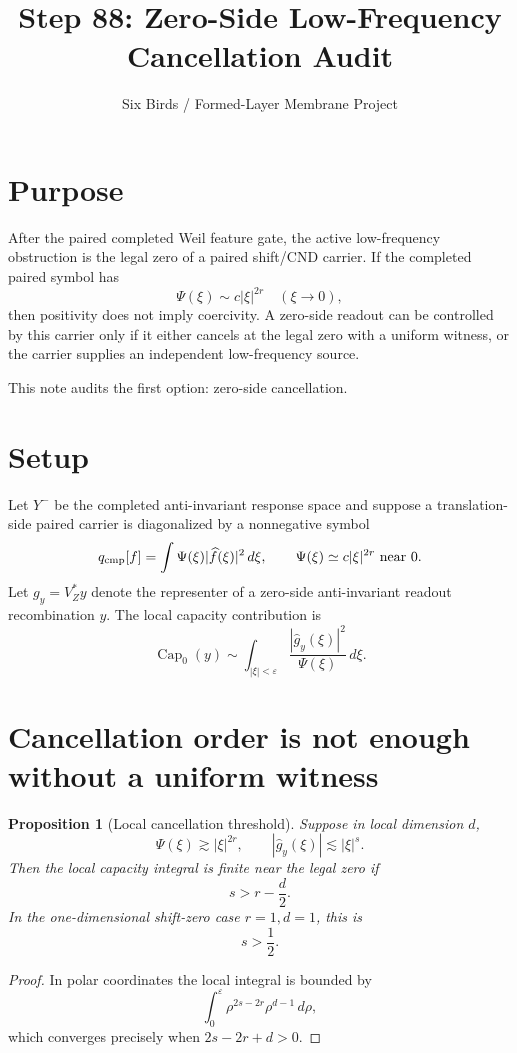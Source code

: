 \documentclass[11pt]{article}
\title{Step 88: Zero-Side Low-Frequency Cancellation Audit}
\author{Six Birds / Formed-Layer Membrane Project}
\date{}
\newtheorem{proposition}{Proposition}
\begin{document}
\maketitle

\section{Purpose}

After the paired completed Weil feature gate, the active low-frequency obstruction is the legal zero of a paired shift/CND carrier.  If the completed paired symbol has
\[
\Psi(\xi)\sim c|\xi|^{2r}
\quad (\xi\to 0),
\]
then positivity does not imply coercivity.  A zero-side readout can be controlled by this carrier only if it either cancels at the legal zero with a uniform witness, or the carrier supplies an independent low-frequency source.

This note audits the first option: zero-side cancellation.

\section{Setup}

Let \(Y^{-}\) be the completed anti-invariant response space and suppose a translation-side paired carrier is diagonalized by a nonnegative symbol
\[
q_{\rm cmp}[f]=\int \Psi(\xi)|\widehat f(\xi)|^2\,d\xi,
\qquad
\Psi(\xi)\simeq c|\xi|^{2r}\text{ near }0 .
\]
Let \(g_y=V_Z^*y\) denote the representer of a zero-side anti-invariant readout recombination \(y\).  The local capacity contribution is
\[
\operatorname{Cap}_{0}(y)
\sim
\int_{|\xi|<\varepsilon}
\frac{|\widehat g_y(\xi)|^2}{\Psi(\xi)}\,d\xi .
\]

\section{Cancellation order is not enough without a uniform witness}

\begin{proposition}[Local cancellation threshold]
Suppose in local dimension \(d\),
\[
\Psi(\xi)\gtrsim |\xi|^{2r},
\qquad
|\widehat g_y(\xi)|\lesssim |\xi|^{s}.
\]
Then the local capacity integral is finite near the legal zero if
\[
s>r-\frac d2 .
\]
In the one-dimensional shift-zero case \(r=1,d=1\), this is
\[
s>\frac12 .
\]
\end{proposition}

\begin{proof}
In polar coordinates the local integral is bounded by
\[
\int_0^\varepsilon \rho^{2s-2r}\rho^{d-1}\,d\rho,
\]
which converges precisely when \(2s-2r+d>0\).
\end{proof}
\end{document}
